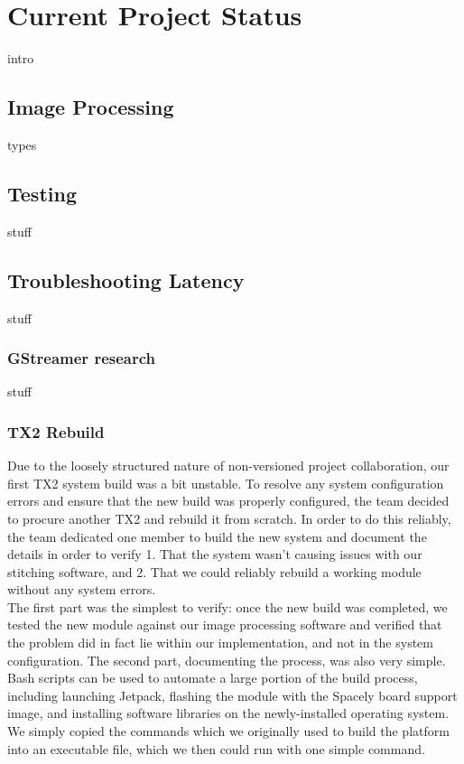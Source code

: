 \documentclass[letterpaper,10pt,serif,draftclsnofoot,onecolumn,compsoc,titlepage]{IEEEtran}
\begin{document}
\section{Current Project Status}

intro\\

\subsection{Image Processing}

types\\

\subsection{Testing}

stuff\\

\subsection{Troubleshooting Latency}

stuff\\

\subsubsection{GStreamer research}

stuff\\

\subsubsection{TX2 Rebuild}

Due to the loosely structured nature of non-versioned project collaboration, our 
first TX2 system build was a bit unstable. To resolve any system configuration errors 
and ensure that the new build was properly configured, the team decided to procure 
another TX2 and rebuild it from scratch. In order to do this reliably, the team 
dedicated one member to build the new system and document the details in order to 
verify 1. That the system wasn't causing issues with our stitching software, and 2. 
That we could reliably rebuild a working module without any system errors.\\

The first part was the simplest to verify: once the new build was completed, we 
tested the new module against our image processing software and verified that the 
problem did in fact lie within our implementation, and not in the system 
configuration. The second part, documenting the process, was also very simple. Bash 
scripts can be used to automate a large portion of the build process, including 
launching Jetpack, flashing the module with the Spacely board support image, and 
installing software libraries on the newly-installed operating system. We simply 
copied the commands which we originally used to build the platform into an executable 
file, which we then could run with one simple command.\\
\end{document}

